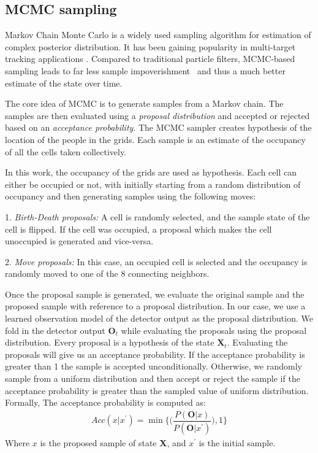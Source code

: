 \subsection{MCMC sampling}
\label{MCMC}
Markov Chain Monte Carlo is a widely used sampling algorithm for estimation of complex posterior distribution. It has been gaining popularity in multi-target tracking applications \cite{khan2004mcmc}. Compared to traditional particle filters, MCMC-based sampling leads to far less sample impoverishment%
~and thus a much better estimate of the state over time.

The core idea of MCMC is to generate samples from a Markov chain. The samples are then evaluated using a \textit{proposal distribution} and accepted or rejected based on an \textit{acceptance probability}. The MCMC sampler creates hypothesis of the location of the people in the grids. Each sample is an estimate of the occupancy of all the cells taken collectively. 

In this work, the occupancy of the grids are used as hypothesis. Each cell can either be occupied or not, with initially starting from a random distribution of occupancy and then generating samples using the following moves:

1. \textit{Birth-Death proposals:}
A cell is randomly selected, and the sample state of the cell is flipped. If the cell was occupied, a proposal which makes the cell unoccupied is generated and vice-versa.

2. \textit{Move proposals:}
In this case, an occupied cell is selected and the occupancy is randomly moved to one of the 8 connecting neighbors.

Once the proposal sample is generated, we evaluate the original sample and the proposed sample with reference to a proposal distribution. In our case, we use a learned observation model of the detector output as the proposal distribution. We fold in the detector output $\textbf{O}_{t}$ while evaluating the proposals using the proposal distribution. Every proposal is a hypothesis of the state $\textbf{X}_{t}$.
Evaluating the proposals will give us an acceptance probability. If the acceptance probability is greater than 1 the sample is accepted unconditionally. 
Otherwise, we randomly sample from a uniform distribution and then accept or reject the sample if the acceptance probability is greater than the sampled value of uniform distribution. Formally,
The acceptance probability is computed as:
\begin{align}
Acc(x|x^{'}) = \min\Big\lbrace\Big(\dfrac{P(\textbf{O}|x)}{P(\textbf{O}|x^{'})}\Big),1\Big\rbrace
\end{align}
Where $x$ is the proposed sample of state \textbf{X}, and $x^{'}$ is the initial sample.

